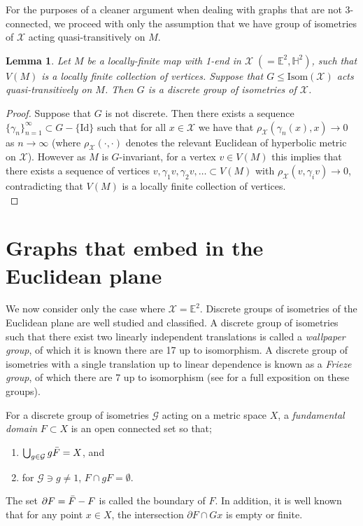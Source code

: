 \documentclass{article}
\numberwithin{equation}{section}
\newcommand{\EE}{\mathbb{E}}
\newcommand{\HH}{\mathbb{H}}
\newtheorem{lemma}{Lemma}[section]
\theoremstyle{definition}
\theoremstyle{remark}
\begin{document}
For the purposes of a cleaner argument when dealing with graphs that are not 3-connected, we proceed with only the assumption that we have group of isometries of $\mathcal{X}$ acting quasi-transitively on $M$.


    
\begin{lemma}\label{lem:discrete group}
    Let $M$ be a locally-finite map with 1-end in $\mathcal{X}\;(=\EE^2,\HH^2)$, such that $V(M)$ is a locally finite collection of vertices. Suppose that $G\leq \text{Isom}(\mathcal{X})$ acts quasi-transitively on $M$. Then $G$ is a discrete group of isometries of $\mathcal{X}$.
\end{lemma}
\begin{proof}
    Suppose that $G$ is not discrete. Then there exists a sequence $\{\gamma_n\}_{n=1}^\infty\subset G-\{\text{Id}\}$ such that for all $x\in\mathcal{X}$ we have that $\rho_\mathcal{X}(\gamma_n(x),x)\rightarrow 0$ as $n\rightarrow \infty$ (where $\rho_\mathcal{X}(\cdot,\cdot)$ denotes the relevant Euclidean of hyperbolic metric on $\mathcal{X}$). However as $M$ is $G$-invariant, for a vertex $v\in V(M)$ this implies that there exists a sequence of vertices $v,\gamma_1v,\gamma_2v,\ldots\subset V(M)$ with $\rho_\mathcal{X}(v,\gamma_iv)\rightarrow 0$, contradicting that $V(M)$ is a locally finite collection of vertices.\\    
\end{proof}

\section{Graphs that embed in the Euclidean plane}\label{sec:Euclid}
We now consider only the case where $\mathcal{X}=\EE^2$. Discrete groups of isometries of the Euclidean plane are well studied and classified. A discrete group of isometries such that there exist two linearly independent translations is called a \textit{wallpaper group}, of which it is known there are 17 up to isomorphism. A discrete group of isometries with a single translation up to linear dependence is known as a \textit{Frieze group}, of which there are 7 up to isomorphism (see \cite{conway2008symmetries} for a full exposition on these groups).

For a discrete group of isometries $\mathcal{G}$ acting on a metric space $X$, a \textit{fundamental domain} $F\subset X$ is an open connected set so that;
\begin{enumerate}[label=(\roman*)]
    \item $\bigcup_{g\in \mathcal{G}}g \Bar{F}=X$, and
    \item for $\mathcal{G}\ni g\neq 1$, ${F}\cap gF=\emptyset$.
\end{enumerate} 
The set $\partial F = \Bar{F}-F$ is called the boundary of $F$.
In addition, it is well known that for any point $x\in X$, the intersection $\partial F\cap Gx$ is empty or finite.
\end{document}
